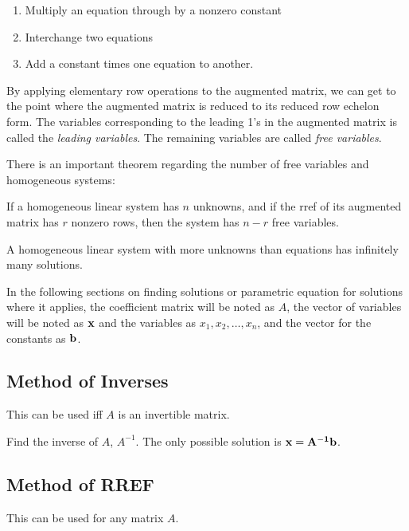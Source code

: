 \documentclass{report}
\begin{document}
		\begin{enumerate}
			\item Multiply an equation through by a nonzero constant
			\item Interchange two equations	
			\item Add a constant times one equation to another.
		\end{enumerate}
		
		By applying elementary row operations to the augmented matrix, we can get to the point where the augmented matrix is reduced to its reduced row echelon form. The variables corresponding to the leading 1's in the augmented matrix is called the \emph{leading variables}. The remaining variables are called \emph{free variables}.
		
		There is an important theorem regarding the number of free variables and homogeneous systems:
		
		\begin{thm}
			If a homogeneous linear system has $n$ unknowns, and if the rref of its augmented matrix has $r$ nonzero rows, then the system has $n-r$ free variables.
		\end{thm}
		
		\begin{coro}
			A homogeneous linear system with more unknowns than equations has infinitely many solutions.
		\end{coro}
		
		In the following sections on finding solutions or parametric equation for solutions where it applies, the coefficient matrix will be noted as $A$, the vector of variables will be noted as $\bf{x}$ and the variables as $x_1, x_2, \dots, x_n$, and the vector for the constants as $\bf{b}$.
		
		\subsection{Method of Inverses}
		
		This can be used iff $A$ is an invertible matrix.
		
		Find the inverse of $A$, $A^{-1}$.
		The only possible solution is $\bf{x}=A^{-1}\bf{b}$.
		
		\subsection{Method of RREF}\label{mthd_rref}
		
		This can be used for any matrix $A$.
		
\end{document}
